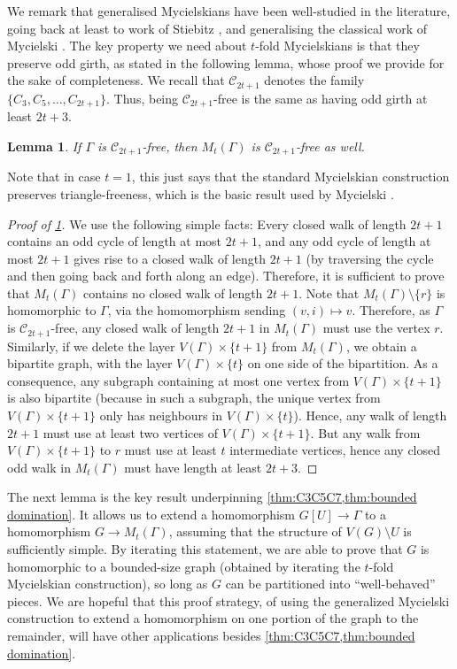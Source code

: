 \documentclass[reqno, english, 12pt]{amsart}
\theoremstyle{plain}
\newtheorem{lemma}[theorem]{Lemma}
\theoremstyle{remark}
\newcommand\C{\mathscr{C}}
\begin{document}
We remark that generalised Mycielskians have been well-studied in the literature, going back at least to work of Stiebitz \cite{Stiebitz}, and generalising the classical work of Mycielski \cite{MR69494}.
The key property we need about $t$-fold Mycielskians is that they preserve odd girth, as stated in the following lemma, whose proof we provide for the sake of completeness. We recall that $\C_{2t+1}$ denotes the family $\{C_3,C_5,\dots,C_{2t+1}\}$. Thus, being $\C_{2t+1}$-free is the same as having odd girth at least $2t+3$.
\begin{lemma}\label{lem:t-fold odd girth}
    If $\Gamma$ is $\C_{2t+1}$-free, then $M_t(\Gamma)$ is $\C_{2t+1}$-free as well.
\end{lemma}
Note that in case $t=1$, this just says that the standard Mycielskian construction preserves triangle-freeness, which is the basic result used by Mycielski \cite{MR69494}. 
\begin{proof}[Proof of \cref{lem:t-fold odd girth}]
    We use the following simple facts: Every closed walk of length $2t+1$ contains an odd cycle of length at most $2t+1$, and any odd cycle of length at most $2t+1$ gives rise to a closed walk of length $2t+1$ (by traversing the cycle and then going back and forth along an edge).
    Therefore, it is sufficient to prove that $M_t(\Gamma)$ contains no closed walk of length $2t+1$. Note that $M_t(\Gamma) \setminus \{r\}$ is homomorphic to $\Gamma$, via the homomorphism sending $(v,i) \mapsto v$. Therefore, as $\Gamma$ is $\C_{2t+1}$-free, any closed walk of length $2t+1$ in $M_t(\Gamma)$ must use the vertex $r$. Similarly, if we delete the layer $V(\Gamma) \times \{t+1\}$ from $M_t(\Gamma)$, we obtain a bipartite graph, with the layer $V(\Gamma) \times \{t\}$ on one side of the bipartition. As a consequence, any subgraph containing at most one vertex from $V(\Gamma) \times \{t+1\}$ is also bipartite (because in such a subgraph, the unique vertex from $V(\Gamma) \times \{t+1\}$ only has neighbours in $V(\Gamma) \times \{t\}$). Hence, any walk of length $2t+1$ must use at least two vertices of $V(\Gamma) \times \{t+1\}$. But any walk from $V(\Gamma) \times \{t+1\}$ to $r$ must use at least $t$ intermediate vertices, hence any closed odd walk in $M_t(\Gamma)$ must have length at least $2t+3$.
\end{proof}



The next lemma is the key result underpinning \cref{thm:C3C5C7,thm:bounded domination}. It allows us to extend a homomorphism $G[U] \to \Gamma$ to a homomorphism $G \to M_t(\Gamma)$, assuming that the structure of $V(G) \setminus U$ is sufficiently simple. 
By iterating this statement, we are able to prove that $G$ is homomorphic to a bounded-size graph (obtained by iterating the $t$-fold Mycielskian construction), so long as $G$ can be partitioned into ``well-behaved'' pieces. We are hopeful that this proof strategy, of using the generalized Mycielski construction to extend a homomorphism on one portion of the graph to the remainder, will have other applications besides \cref{thm:C3C5C7,thm:bounded domination}.
\end{document}
